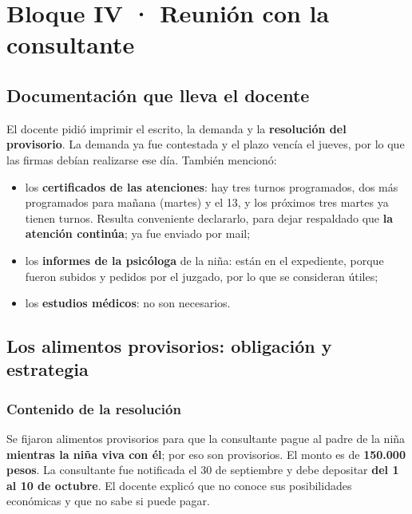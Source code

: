 \documentclass[12pt,oneside]{book}
\begin{document}
\chapter[Reunión con la consultante]{Bloque IV · Reunión con la consultante}

\section{Documentación que lleva el docente}

El docente pidió imprimir el escrito, la demanda y la \textbf{resolución del provisorio}. La demanda ya fue contestada y el plazo vencía el jueves, por lo que las firmas debían realizarse ese día. También mencionó:

\begin{itemize}
    \item los \textbf{certificados de las atenciones}: hay tres turnos programados, dos más programados para mañana (martes) y el 13, y los próximos tres martes ya tienen turnos. Resulta conveniente declararlo, para dejar respaldado que \textbf{la atención continúa}; ya fue enviado por mail;
    \item los \textbf{informes de la psicóloga} de la niña: están en el expediente, porque fueron subidos y pedidos por el juzgado, por lo que se consideran útiles;
    \item los \textbf{estudios médicos}: no son necesarios.
\end{itemize}

\section{Los alimentos provisorios: obligación y estrategia}

\subsection{Contenido de la resolución}

Se fijaron alimentos provisorios para que la consultante pague al padre de la niña \textbf{mientras la niña viva con él}; por eso son provisorios. El monto es de \textbf{150.000 pesos}. La consultante fue notificada el 30 de septiembre y debe depositar \textbf{del 1 al 10 de octubre}. El docente explicó que no conoce sus posibilidades económicas y que no sabe si puede pagar.
\end{document}
